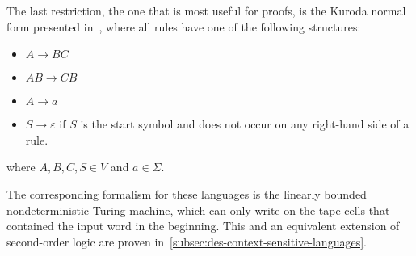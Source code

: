 The last restriction, the one that is most useful for proofs, is the Kuroda normal form presented in~\cite{Pettorossi2022}, where all rules have one of the following structures:
\begin{itemize}
    \setlength\itemsep{0.15em}
    \item $A \to BC$
    \item $AB \to CB$
    \item $A \to a$
    \item $S \to \varepsilon$ if $S$ is the start symbol and does not occur on any right-hand side of a rule.
\end{itemize}
where $A, B, C, S \in V$ and $a \in \Sigma$.

The corresponding formalism for these languages is the linearly bounded nondeterministic Turing machine, which can only write on the tape cells that contained the input word in the beginning.
This and an equivalent extension of second-order logic are proven in~\cref{subsec:des-context-sensitive-languages}.